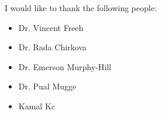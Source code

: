\begin{acknowledgements}
I would like to thank the following people:

\begin{itemize}
\item Dr. Vincent Freeh
\item Dr. Rada Chirkova
\item Dr. Emerson Murphy-Hill
\item Dr. Pual Mugge
\item Kamal Kc
\end{itemize}

\end{acknowledgements}


\thesistableofcontents

\thesislistoftables

\thesislistoffigures
